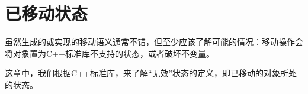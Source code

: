 \chapter{已移动状态}
虽然生成的或实现的移动语义通常不错，但至少应该了解可能的情况：移动操作会将对象置为C++标准库不支持的状态，或者破坏不变量。

这章中，我们根据C++标准库，来了解“无效”状态的定义，即已移动的对象所处的状态。



